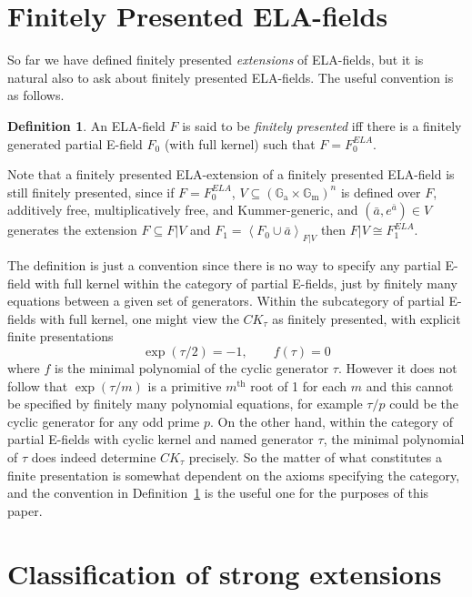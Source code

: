 \documentclass[12pt]{amsart}
\theoremstyle{definition}
\newtheorem{defn}[prop]{Definition}
\begin{document}
\section{Finitely Presented ELA-fields}

So far we have defined finitely presented \emph{extensions} of ELA-fields, but it is natural also to ask about finitely presented ELA-fields. The useful convention is as follows.
\begin{defn}\label{fp defn}
An ELA-field $F$ is said to be \emph{finitely presented} iff there is a finitely generated partial E-field $F_0$ (with full kernel) such that $F = F_0^{ELA}$.
\end{defn}
Note that a finitely presented ELA-extension of a finitely presented ELA-field is still finitely presented, since if $F = F_0^{ELA}$, 
$V {\subseteq} ({\ensuremath{\mathbb{G}_\mathrm{a}}} {\ensuremath{\times}} {\ensuremath{\mathbb{G}_\mathrm{m}}})^n$ is defined over $F$, additively free, multiplicatively free, and {Kummer-generic}, and $({{\ensuremath{\bar{a}}}},e^{{\ensuremath{\bar{a}}}}) \in V$ generates the extension $F {\subseteq} F|V$ and $F_1 =  {\ensuremath{\left\langle {F_0 \cup {{\ensuremath{\bar{a}}}}} \right\rangle}}_{F|V}$ then $F|V {\cong} F_1^{ELA}$.

The definition is just a convention since there is no way to specify any partial E-field with full kernel within the category of partial E-fields, just by finitely many equations between a given set of generators. Within the subcategory of partial E-fields with full kernel, one might view the $CK_\tau$ as finitely presented, with explicit finite presentations
\[\exp(\tau/2) = -1, \qquad f(\tau)=0\]
where $f$ is the minimal polynomial of the cyclic generator $\tau$. However it does not follow that $\exp(\tau/m)$ is a primitive $m{{\ensuremath{{}^{\mathrm{th}}}}}$
root of 1 for each $m$ and this cannot be specified by finitely many polynomial equations, for example $\tau/p$ could be the cyclic generator for any odd prime $p$. On the other hand, within the category of partial E-fields with cyclic kernel and named generator $\tau$, the minimal polynomial of $\tau$ does indeed determine $CK_\tau$ precisely. So the matter of what constitutes a finite presentation is somewhat dependent on the axioms specifying the category, and the convention in Definition~\ref{fp defn} is the useful one for the purposes of this paper.

\section{Classification of strong extensions}
\end{document}

